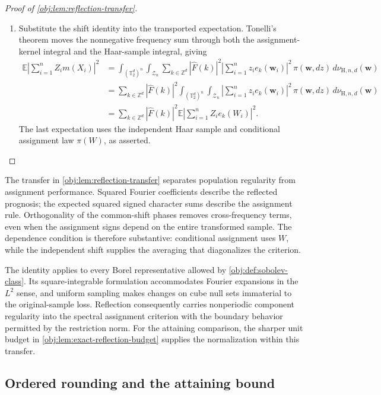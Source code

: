 \documentclass[11pt]{article}
\begin{document}
\begin{proof}[Proof of \cref{obj:lem:reflection-transfer}]
\begin{enumerate}
\item Substitute the shift identity into the transported expectation.
Tonelli's theorem moves the nonnegative frequency sum through both the
assignment-kernel integral and the Haar-sample integral, giving
\[
\begin{aligned}
\mathbb E\left|\sum_{i=1}^n Z_i m(X_i)\right|^2
&=
\int_{(\mathbb T_2^d)^n}\int_{\mathcal Z_n}
\sum_{k\in\mathbb Z^d}
|\widehat F(k)|^2
\left|\sum_{i=1}^n z_i e_k(\mathbf w_i)\right|^2
\,\pi(\mathbf w,dz)\,d\nu_{\mathrm H,n,d}(\mathbf w)\\
&=
\sum_{k\in\mathbb Z^d}|\widehat F(k)|^2
\int_{(\mathbb T_2^d)^n}\int_{\mathcal Z_n}
\left|\sum_{i=1}^n z_i e_k(\mathbf w_i)\right|^2
\,\pi(\mathbf w,dz)\,d\nu_{\mathrm H,n,d}(\mathbf w)\\
&=
\sum_{k\in\mathbb Z^d}|\widehat F(k)|^2
\mathbb E\left|\sum_{i=1}^n Z_i e_k(W_i)\right|^2.
\end{aligned}
\]
The last expectation uses the independent Haar sample and conditional
assignment law \(\pi(W)\), as asserted.
\end{enumerate}
\end{proof}

The transfer in \cref{obj:lem:reflection-transfer} separates population regularity from assignment performance. Squared Fourier coefficients describe the reflected prognosis; the expected squared signed character sums describe the assignment rule. Orthogonality of the common-shift phases removes cross-frequency terms, even when the assignment signs depend on the entire transformed sample. The dependence condition is therefore substantive: conditional assignment uses \(W\), while the independent shift supplies the averaging that diagonalizes the criterion.

The identity applies to every Borel representative allowed by \cref{obj:def:sobolev-class}. Its square-integrable formulation accommodates Fourier expansions in the \(L^2\) sense, and uniform sampling makes changes on cube null sets immaterial to the original-sample loss. Reflection consequently carries nonperiodic component regularity into the spectral assignment criterion with the boundary behavior permitted by the restriction norm. For the attaining comparison, the sharper unit budget in \cref{obj:lem:exact-reflection-budget} supplies the normalization within this transfer.

\subsection{Ordered rounding and the attaining bound}
\end{document}
